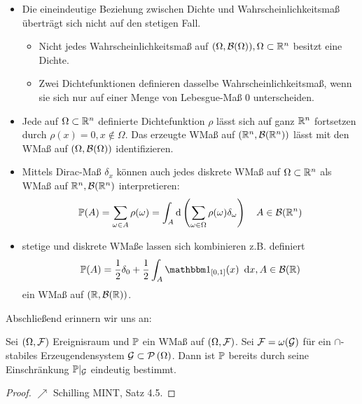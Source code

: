 \begin{*bemerkung}
    \begin{itemize}[leftmargin=*, nolistsep]
        \item Die eineindeutige Beziehung zwischen Dichte und Wahrscheinlichkeitsmaß überträgt sich nicht auf den stetigen Fall.
        \begin{itemize}[nolistsep]
            \item Nicht jedes Wahrscheinlichkeitsmaß auf $(\Omega, \borel{\Omega}), \Omega \subset \Rn$ besitzt eine Dichte.
            \item Zwei Dichtefunktionen definieren dasselbe Wahrscheinlichkeitsmaß, wenn sie sich nur auf einer Menge von Lebesgue-Maß $0$ unterscheiden.
        \end{itemize}
        \item Jede auf $\Omega \subset \Rn$ definierte Dichtefunktion $\rho$ lässt sich auf ganz $\Rn$ fortsetzen durch $\rho(x) = 0, x \notin \Omega$. Das erzeugte WMaß auf $(\Rn, \borel{\Rn})$ lässt mit den WMaß auf $(\Omega, \borel{\Omega})$ identifizieren.
        \item Mittels Dirac-Maß $\delta_{x}$ können auch jedes diskrete WMaß auf $\Omega \subset \Rn$ als WMaß auf $\Rn, \borel{\Rn}$ interpretieren:
        \begin{equation*}
            \P(A) = \sum_{\omega \in A} \rho(\omega) = \int_{A} \mathrm{d} \left( \sum_{\omega \in \Omega} \rho(\omega)\delta_{\omega} \right) \quad A \in \borel{\Rn}
        \end{equation*}
        \item stetige und diskrete WMaße lassen sich kombinieren z.B. definiert
        \begin{equation*}
            \P(A) = \frac{1}{2} \delta_{0} + \frac{1}{2} \int_{A} \one_{[0,1]}(x) \dx, A \in \borel{\R}
        \end{equation*}
        ein WMaß auf $(\R, \borel{\R})$.
    \end{itemize}
\end{*bemerkung}

Abschließend erinnern wir uns an:

\begin{satz} \label{satz: 1.9_eindeutigkeitssatz}
    Sei $(\Omega, \ereignisF)$ Ereignisraum und $\P$ ein WMaß auf $(\Omega, \ereignisF)$. 
    Sei $\ereignisF = \omega(\mathcal{G})$ für ein $\cap$-stabiles Erzeugendensystem $\mathcal{G} \subset \pows{\Omega}$. 
    Dann ist $\P$ bereits durch seine Einschränkung $\P |_{\mathcal{G}}$ eindeutig bestimmt.
\end{satz}
\begin{proof}
    $\nearrow$ Schilling MINT, Satz 4.5.
\end{proof}

